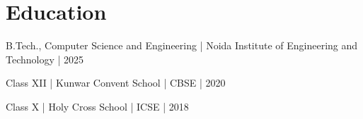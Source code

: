 \documentclass[a4paper,11pt]{article}
\begin{document}
\section{Education}
B.Tech., Computer Science and Engineering | Noida Institute of Engineering and Technology | 2025\par
Class XII | Kunwar Convent School | CBSE | 2020\par
Class X | Holy Cross School | ICSE | 2018\par
\end{document}
